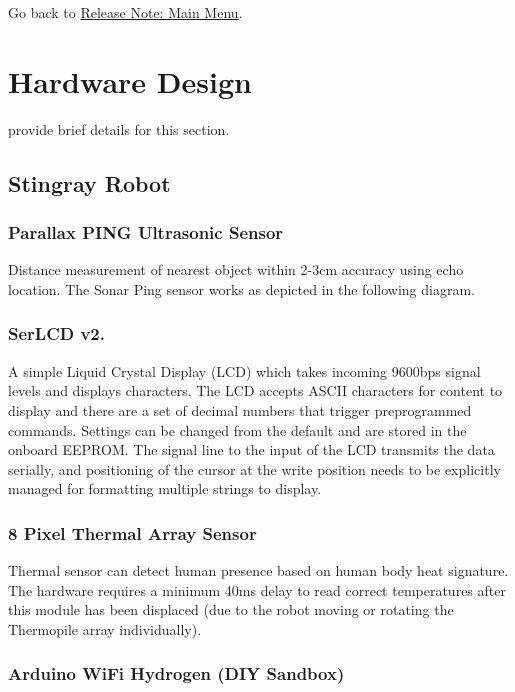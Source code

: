 Go back to \hyperlink{product_release_main_page}{Release Note\+: Main Menu}. \hypertarget{hardware_design}{}\section{Hardware Design}\label{hardware_design}
provide brief details for this section. \hypertarget{hardware_design_stingray}{}\subsection{Stingray Robot}\label{hardware_design_stingray}
\hypertarget{hardware_design_ultrasonic}{}\subsubsection{Parallax P\+I\+N\+G Ultrasonic Sensor}\label{hardware_design_ultrasonic}
Distance measurement of nearest object within 2-\/3cm accuracy using echo location. The Sonar Ping sensor works as depicted in the following diagram. \hypertarget{hardware_design_serlcd}{}\subsubsection{Ser\+L\+C\+D v2.}\label{hardware_design_serlcd}
A simple Liquid Crystal Display (L\+CD) which takes incoming 9600bps signal levels and displays characters. The L\+CD accepts A\+S\+C\+II characters for content to display and there are a set of decimal numbers that trigger preprogrammed commands. Settings can be changed from the default and are stored in the onboard E\+E\+P\+R\+OM. The signal line to the input of the L\+CD transmits the data serially, and positioning of the cursor at the write position needs to be explicitly managed for formatting multiple strings to display.  \hypertarget{hardware_design_thermal}{}\subsubsection{8 Pixel Thermal Array Sensor}\label{hardware_design_thermal}
Thermal sensor can detect human presence based on human body heat signature. The hardware requires a minimum 40ms delay to read correct temperatures after this module has been displaced (due to the robot moving or rotating the Thermopile array individually).  \hypertarget{hardware_design_wifi}{}\subsubsection{Arduino Wi\+Fi Hydrogen (\+D\+I\+Y Sandbox)}\label{hardware_design_wifi}
